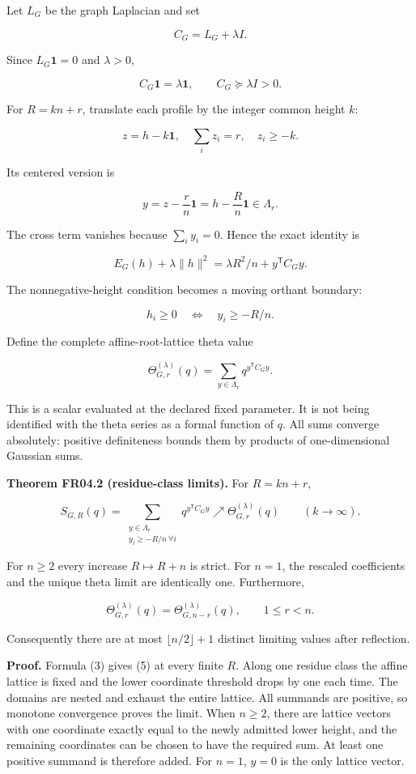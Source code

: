 \documentclass[
  11pt,
  a4paper,
]{report}
\begin{document}
Let \(L_G\) be the graph Laplacian and set

\[
 C_G=L_G+\lambda I.
\]

Since \(L_G\mathbf1=0\) and \(\lambda>0\),

\[
 C_G\mathbf1=\lambda\mathbf1,
 \qquad C_G\succeq\lambda I>0.
\]

For \(R=kn+r\), translate each profile by the integer common height
\(k\):

\[
 z=h-k\mathbf1,
 \quad \sum_i z_i=r,
 \quad z_i\ge-k.
\]

Its centered version is

\[
 y=z-\frac r n\mathbf1=h-\frac Rn\mathbf1\in\Lambda_r.
\]

The cross term vanishes because \(\sum_i y_i=0\). Hence the exact
identity is

\[
 \boxed{E_G(h)+\lambda\|h\|^2
 =\lambda R^2/n+y^{\mathsf T}C_Gy.}
 \tag{3}
\]

The nonnegative-height condition becomes a moving orthant boundary:

\[
 h_i\ge0\quad\Longleftrightarrow\quad y_i\ge-R/n.
\]

Define the complete affine-root-lattice theta value

\[
 \Theta_{G,r}^{(\lambda)}(q)
 =\sum_{y\in\Lambda_r}q^{y^{\mathsf T}C_Gy}.
 \tag{4}
\]

This is a scalar evaluated at the declared fixed parameter. It is not
being identified with the theta series as a formal function of \(q\).
All sums converge absolutely: positive definiteness bounds them by
products of one-dimensional Gaussian sums.

\textbf{Theorem FR04.2 (residue-class limits).} For \(R=kn+r\),

\[
 S_{G,R}(q)
 =\sum_{\substack{y\in\Lambda_r\\y_i\ge-R/n\ \forall i}}
 q^{y^{\mathsf T}C_Gy}
 \nearrow \Theta_{G,r}^{(\lambda)}(q)
 \qquad(k\to\infty).
 \tag{5}
\]

For \(n\ge2\) every increase \(R\mapsto R+n\) is strict. For \(n=1\),
the rescaled coefficients and the unique theta limit are identically
one. Furthermore,

\[
 \boxed{\Theta_{G,r}^{(\lambda)}(q)
 =\Theta_{G,n-r}^{(\lambda)}(q),\qquad 1\le r<n.}
 \tag{6}
\]

Consequently there are at most \(\lfloor n/2\rfloor+1\) distinct
limiting values after reflection.

\textbf{Proof.} Formula (3) gives (5) at every finite \(R\). Along one
residue class the affine lattice is fixed and the lower coordinate
threshold drops by one each time. The domains are nested and exhaust the
entire lattice. All summands are positive, so monotone convergence
proves the limit. When \(n\ge2\), there are lattice vectors with one
coordinate exactly equal to the newly admitted lower height, and the
remaining coordinates can be chosen to have the required sum. At least
one positive summand is therefore added. For \(n=1\), \(y=0\) is the
only lattice vector.
\end{document}
